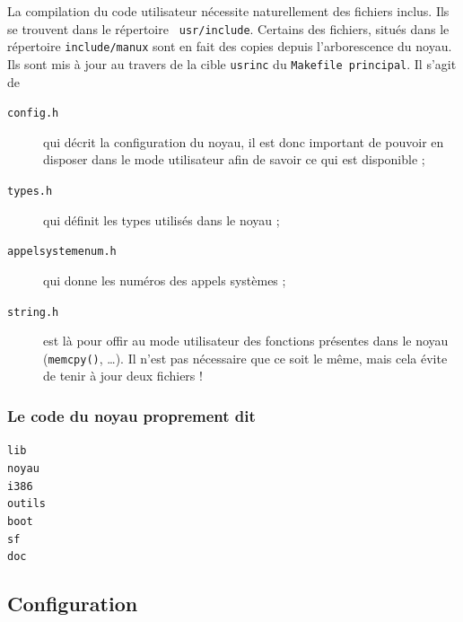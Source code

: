    La compilation du code utilisateur nécessite naturellement des
fichiers inclus. Ils se trouvent dans le répertoire {\tt
  usr/include}. Certains
     des fichiers, situés dans le répertoire {\tt include/manux} sont
     en fait des copies depuis l'arborescence du noyau. Ils sont mis à
     jour au travers de la cible {\tt usrinc} du {\tt Makefile
       principal}. Il s'agit de 

\begin{description}
   \item[{\tt config.h}] qui décrit la configuration du noyau, il est
     donc important de pouvoir en disposer dans le mode utilisateur
     afin de savoir ce qui est disponible ;
   \item[{\tt types.h}] qui définit les types utilisés dans le noyau ;
   \item[{\tt appelsystemenum.h}] qui donne les numéros des appels
     systèmes ;
   \item[{\tt string.h}] est là pour offir au mode utilisateur des
     fonctions présentes dans le noyau ({\tt memcpy()}, \ldots). Il
     n'est pas nécessaire que ce soit le même, mais cela évite de
     tenir à jour deux fichiers !
\end{description}

%
\subsubsection{Le code du noyau proprement dit}


\begin{description}
   \item[{\tt lib}]
   \item[{\tt noyau}]
   \item[{\tt i386}]
   \item[{\tt outils}]
   \item[{\tt boot}]
   \item[{\tt sf}]
   \item[{\tt doc}]
\end{description}

%   
\subsection{Configuration}

